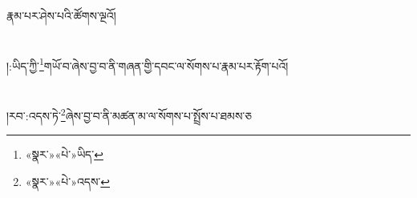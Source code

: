 རྣམ་པར་ཤེས་པའི་ཚོགས་ལྔའོ།\chapter{ }།:ཡིད་ཀྱི་\footnote{«སྣར་»«པེ་»ཡིད་}གཡོ་བ་ཞེས་བྱ་བ་ནི་གཞན་གྱི་དབང་ལ་སོགས་པ་རྣམ་པར་རྟོག་པའོ།\chapter{ }།རབ་:འདས་ཏེ་\footnote{«སྣར་»«པེ་»འདས་}ཞེས་བྱ་བ་ནི་མཚན་མ་ལ་སོགས་པ་སྤྲོས་པ་ཐམས་ཅ